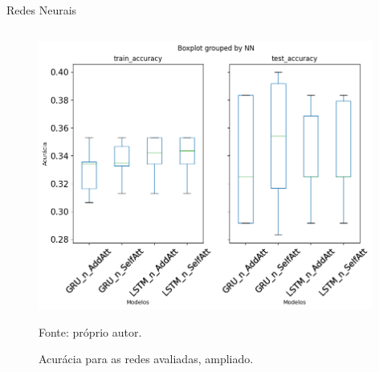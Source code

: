 \begin{frame}{Redes Neurais}
\begin{columns}
\begin{column}{0.5\textwidth}
                \begin{figure}[htbp]
                    \centering
                    \caption{Acurácia para as redes avaliadas, ampliado.}
                    \label{fig:boxplotval_zoom}
                    \includegraphics[width=0.98\textwidth]{./images/boxplotval_zoom.png}
                    \par \footnotesize Fonte: próprio autor.
                \end{figure}

            \end{column}
        \end{columns}


    \end{frame}





